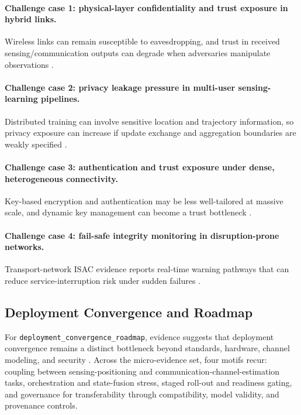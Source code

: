 \paragraph{Challenge case 1: physical-layer confidentiality and trust exposure in hybrid links.}
Wireless links can remain susceptible to eavesdropping, and trust in received sensing/communication outputs can degrade when adversaries manipulate observations \cite{O_ISAC_145}.

\paragraph{Challenge case 2: privacy leakage pressure in multi-user sensing-learning pipelines.}
Distributed training can involve sensitive location and trajectory information, so privacy exposure can increase if update exchange and aggregation boundaries are weakly specified \cite{O_ISAC_039}.

\paragraph{Challenge case 3: authentication and trust exposure under dense, heterogeneous connectivity.}
Key-based encryption and authentication may be less well-tailored at massive scale, and dynamic key management can become a trust bottleneck \cite{O_ISAC_156}.

\paragraph{Challenge case 4: fail-safe integrity monitoring in disruption-prone networks.}
Transport-network ISAC evidence reports real-time warning pathways that can reduce service-interruption risk under sudden failures \cite{O_ISAC_041}.

\subsection{Deployment Convergence and Roadmap}

For \texttt{deployment\_convergence\_roadmap}, evidence suggests that deployment convergence remains a distinct bottleneck beyond standards, hardware, channel modeling, and security \cite{O_ISAC_039,O_ISAC_151,O_ISAC_163,O_ISAC_200}. Across the micro-evidence set, four motifs recur: coupling between sensing-positioning and communication-channel-estimation tasks, orchestration and state-fusion stress, staged roll-out and readiness gating, and governance for transferability through compatibility, model validity, and provenance controls.

